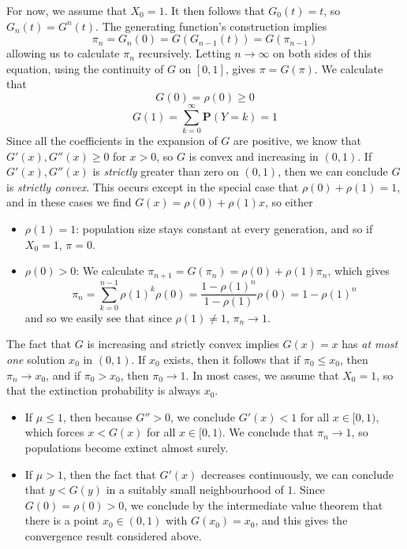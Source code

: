 For now, we assume that $X_0 = 1$. It then follows that $G_0(t) = t$, so $G_n(t) = G^n(t)$. The generating function's construction implies
%
\[ \pi_n = G_n(0) = G(G_{n-1}(t)) = G(\pi_{n-1}) \]
%
allowing us to calculate $\pi_n$ recursively. Letting $n \to \infty$ on both sides of this equation, using the continuity of $G$ on $[0,1]$, gives $\pi = G(\pi)$. We calculate that
%
\[ G(0) = \rho(0) \geq 0 \]
%
\[ G(1) = \sum_{k = 0}^\infty \mathbf{P}(Y = k) = 1 \]
%
Since all the coefficients in the expansion of $G$ are positive, we know that $G'(x), G''(x) \geq 0$ for $x > 0$, so $G$ is convex and increasing in $(0,1)$. If $G'(x), G''(x)$ is {\it strictly} greater than zero on $(0,1)$, then we can conclude $G$ is {\it strictly convex}. This occurs except in the special case that $\rho(0) + \rho(1) = 1$, and in these cases we find $G(x) = \rho(0) + \rho(1) x$, so either
%
\begin{itemize}
    \item $\rho(1) = 1$: population size stays constant at every generation, and so if $X_0 = 1$, $\pi = 0$.

    \item $\rho(0) > 0$: We calculate $\pi_{n+1} = G(\pi_n) = \rho(0) + \rho(1) \pi_n$, which gives
    \[ \pi_n = \sum_{k = 0}^{n-1} \rho(1)^k \rho(0) = \frac{1 - \rho(1)^n}{1 - \rho(1)} \rho(0) = 1 - \rho(1)^n \]
    and so we easily see that since $\rho(1) \neq 1$, $\pi_n \to 1$.
\end{itemize}
%
The fact that $G$ is increasing and strictly convex implies $G(x) = x$ has {\it at most one} solution $x_0$ in $(0,1)$. If $x_0$ exists, then it follows that if $\pi_0 \leq x_0$, then $\pi_n \to x_0$, and if $\pi_0 > x_0$, then $\pi_0 \to 1$. In most cases, we assume that $X_0 = 1$, so that the extinction probability is always $x_0$.
%
\begin{itemize}
    \item If $\mu \leq 1$, then because $G'' > 0$, we conclude $G'(x) < 1$ for all $x \in [0,1)$, which forces $x < G(x)$ for all $x \in [0,1)$. We conclude that $\pi_n \to 1$, so populations become extinct almost surely.

    \item If $\mu > 1$, then the fact that $G'(x)$ decreases continuously, we can conclude that $y < G(y)$ in a suitably small neighbourhood of $1$. Since $G(0) = \rho(0) > 0$, we conclude by the intermediate value theorem that there is a point $x_0 \in (0,1)$ with $G(x_0) = x_0$, and this gives the convergence result considered above.
\end{itemize}
